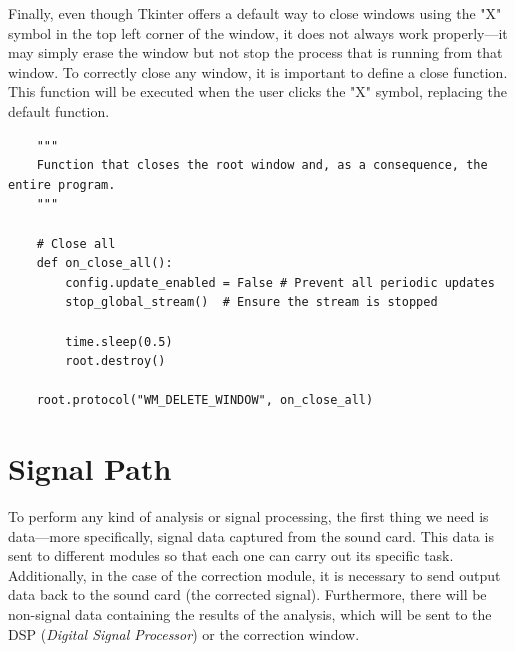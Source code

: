Finally, even though Tkinter offers a default way to close windows using the "X" symbol in the top left corner of the window, it does not always work properly—it may simply erase the window but not stop the process that is running from that window. To correctly close any window, it is important to define a close function. This function will be executed when the user clicks the "X" symbol, replacing the default function.

\begin{verbatim}
	"""
	Function that closes the root window and, as a consequence, the entire program.
	"""
	
	# Close all
	def on_close_all():
		config.update_enabled = False # Prevent all periodic updates
		stop_global_stream()  # Ensure the stream is stopped
	
		time.sleep(0.5)
		root.destroy()
	
	root.protocol("WM_DELETE_WINDOW", on_close_all)	
\end{verbatim}



\section{Signal Path}

To perform any kind of analysis or signal processing, the first thing we need is data—more specifically, signal data captured from the sound card. This data is sent to different modules so that each one can carry out its specific task. Additionally, in the case of the correction module, it is necessary to send output data back to the sound card (the corrected signal). Furthermore, there will be non-signal data containing the results of the analysis, which will be sent to the DSP (\textit{Digital Signal Processor}) or the correction window.

